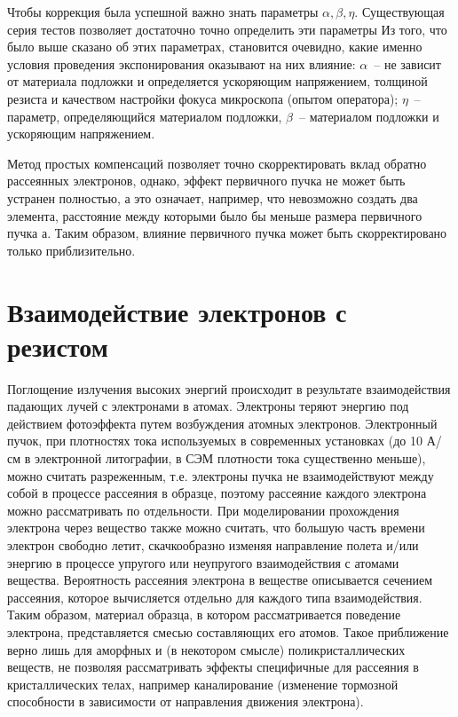 Чтобы коррекция была успешной важно знать параметры $\alpha,\beta,\eta$. Существующая серия тестов позволяет достаточно точно определить эти параметры Из того, что было выше сказано об этих параметрах, становится очевидно, какие именно условия проведения экспонирования оказывают на них влияние: $\alpha$~-- не зависит от материала подложки и определяется ускоряющим напряжением, толщиной резиста и качеством настройки фокуса микроскопа (опытом оператора); $\eta$~-- параметр, определяющийся материалом подложки, $\beta$~-- материалом подложки и ускоряющим напряжением.

Метод простых компенсаций позволяет точно скорректировать вклад обратно рассеянных электронов, однако, эффект первичного пучка не может быть устранен полностью, а это означает, например, что невозможно создать два элемента, расстояние между которыми было бы меньше размера первичного пучка а. Таким образом, влияние первичного пучка может быть скорректировано только приблизительно.

\section{Взаимодействие электронов с резистом}

Поглощение излучения высоких энергий происходит в результате взаимодействия падающих лучей с электронами в атомах. Электроны теряют энергию под действием фотоэффекта путем возбуждения атомных электронов.
Электронный пучок, при плотностях тока используемых в современных установках (до 10 А/см в электронной литографии, в СЭМ плотности тока существенно меньше), можно считать разреженным, т.е. электроны пучка не взаимодействуют между собой в процессе рассеяния в образце, поэтому рассеяние каждого электрона можно рассматривать по отдельности.
При моделировании прохождения электрона через вещество также можно считать, что большую часть времени электрон свободно летит, скачкообразно изменяя направление полета и/или энергию в процессе упругого или неупругого взаимодействия с атомами вещества. Вероятность рассеяния электрона в веществе описывается сечением рассеяния, которое вычисляется отдельно для каждого типа взаимодействия.
Таким образом, материал образца, в котором рассматривается поведение электрона, представляется смесью составляющих его атомов. Такое приближение верно лишь для аморфных и (в некотором смысле) поликристаллических веществ, не позволяя рассматривать эффекты специфичные для рассеяния в кристаллических телах, например каналирование (изменение тормозной способности в зависимости от направления движения электрона).

